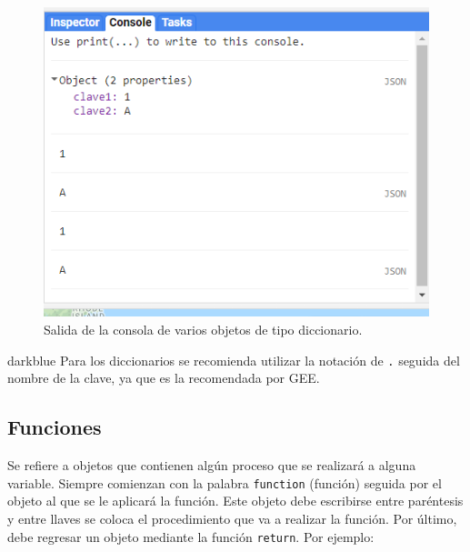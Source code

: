 \documentclass[
  12pt,
  letterpaper,
  twoside]{book}
\begin{document}
\begin{figure}[H]

{\centering \includegraphics[width=0.6\linewidth]{Img/ej3} 

}

\caption{Salida de la consola de varios objetos de tipo diccionario.}\label{fig:f55}
\end{figure}

\begin{bluebox2}

\begin{awesomeblock}{5pt}{\faLightbulb}{darkblue}
Para los diccionarios se recomienda utilizar la notación de \texttt{.} seguida del nombre de la clave, ya que es la recomendada por GEE.

\end{awesomeblock}

\end{bluebox2}

\hypertarget{funciones}{%
\subsection*{Funciones}\label{funciones}}

Se refiere a objetos que contienen algún proceso que se realizará a alguna variable. Siempre comienzan con la palabra \texttt{function} (función) seguida por el objeto al que se le aplicará la función. Este objeto debe escribirse entre paréntesis y entre llaves se coloca el procedimiento que va a realizar la función. Por último, debe regresar un objeto mediante la función \texttt{return}. Por ejemplo:
\end{document}
